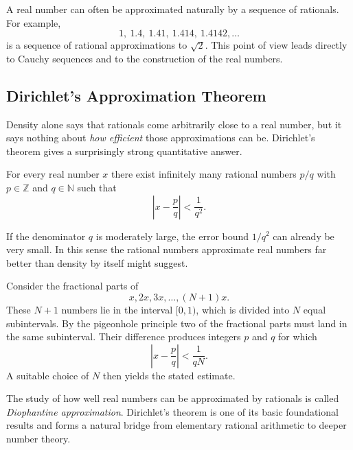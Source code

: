 \begin{remark}
A real number can often be approximated naturally by a sequence of rationals.  For example,
\[
1,\ 1.4,\ 1.41,\ 1.414,\ 1.4142,\dots
\]
is a sequence of rational approximations to $\sqrt{2}$.  This point of view leads directly to Cauchy
sequences and to the construction of the real numbers.
\end{remark}

\subsection{Dirichlet's Approximation Theorem}

Density alone says that rationals come arbitrarily close to a real number, but it says nothing about
\emph{how efficient} those approximations can be.  Dirichlet's theorem gives a surprisingly strong
quantitative answer.

\begin{theorem}
\label{thm:dirichlet-approx}
For every real number $x$ there exist infinitely many rational numbers $p/q$ with $p\in\mathbb{Z}$ and
$q\in\mathbb{N}$ such that
\[
\left|x-\frac{p}{q}\right|<\frac{1}{q^2}.
\]
\end{theorem}

\begin{remark}[Interpretation]
If the denominator $q$ is moderately large, the error bound $1/q^2$ can already be very small.  In
this sense the rational numbers approximate real numbers far better than density by itself might
suggest.
\end{remark}

\begin{remark}
Consider the fractional parts of
\[
x,2x,3x,\dots,(N+1)x.
\]
These $N+1$ numbers lie in the interval $[0,1)$, which is divided into $N$ equal subintervals.
By the pigeonhole principle two of the fractional parts must land in the same subinterval.  Their
difference produces integers $p$ and $q$ for which
\[
\left|x-\frac{p}{q}\right|<\frac{1}{qN}.
\]
A suitable choice of $N$ then yields the stated estimate.
\end{remark}

\begin{remark}
The study of how well real numbers can be approximated by rationals is called
\emph{Diophantine approximation}.  Dirichlet's theorem is one of its basic foundational results and
forms a natural bridge from elementary rational arithmetic to deeper number theory.
\end{remark}


